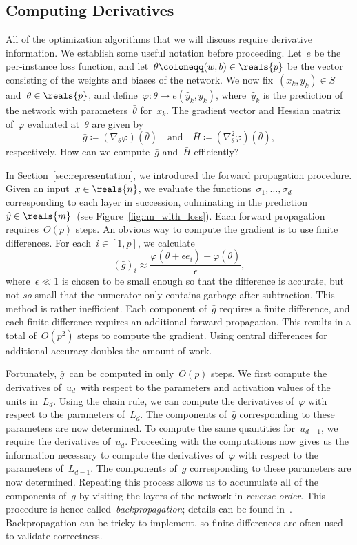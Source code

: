 \documentclass[11pt,a4paper]{article}
\numberwithin{equation}{section}
\begin{document}
\subsection{Computing Derivatives}
\label{sec:computing_derivatives}

All of the optimization algorithms that we will discuss require derivative
information. We establish some useful notation before proceeding. Let~$e$ be the
per-instance loss function, and let~$\theta \coloneqq (w, b) \in \reals{p}$ be
the vector consisting of the weights and biases of the network. We now
fix~$(x_k, y_k) \in S$ and~$\bar{\theta} \in \reals{p}$, and define~$\varphi :
\theta \mapsto e(\hat{y}_k, y_k)$, where~$\hat{y}_k$ is the prediction of the
network with parameters~$\bar{\theta}$ for~$x_k$. The gradient vector and
Hessian matrix of~$\varphi$ evaluated at~$\bar{\theta}$ are given by
\[
	\bar{g} \coloneqq (\nabla_\theta \varphi)(\bar{\theta})
	\quad\text{and}\quad
	\bar{H} \coloneqq (\nabla^2_\theta \varphi)(\bar{\theta}),
\]
respectively. How can we compute~$\bar{g}$ and~$\bar{H}$ efficiently?

In Section~\ref{sec:representation}, we introduced the forward propagation
procedure. Given an input~$x \in \reals{n}$, we evaluate the
functions~$\sigma_1, \ldots, \sigma_d$ corresponding to each layer in
succession, culminating in the prediction~$\hat{y} \in \reals{m}$~(see
Figure~\ref{fig:nn_with_loss}). Each forward propagation requires~$O(p)$ steps.
An obvious way to compute the gradient is to use finite differences. For each~$i
\in [1, p]$, we calculate
\[
	(\bar{g})_i \approx \frac{\varphi(\bar{\theta} + \epsilon e_i) -
		\varphi(\bar{\theta})}{\epsilon},
\]
where~$\epsilon \ll 1$ is chosen to be small enough so that the difference is
accurate, but not \emph{so} small that the numerator only contains garbage after
subtraction. This method is rather inefficient. Each component of~$\bar{g}$
requires a finite difference, and each finite difference requires an additional
forward propagation. This results in a total of~$O(p^2)$ steps to compute the
gradient. Using central differences for additional accuracy doubles the amount
of work.

Fortunately, $\bar{g}$~can be computed in only~$O(p)$ steps. We first compute
the derivatives of~$u_d$~with respect to the parameters and activation values of
the units in~$L_d$. Using the chain rule, we can compute the derivatives
of~$\varphi$ with respect to the parameters of~$L_d$. The components
of~$\bar{g}$ corresponding to these parameters are now determined. To compute
the same quantities for~$u_{d - 1}$, we require the derivatives of~$u_{d}$.
Proceeding with the computations now gives us the information necessary to
compute the derivatives of~$\varphi$ with respect to the parameters of~$L_{d -
1}$. The components of~$\bar{g}$ corresponding to these parameters are now
determined. Repeating this process allows us to accumulate all of the components
of~$\bar{g}$ by visiting the layers of the network in \emph{reverse order}.
This procedure is hence called~\emph{backpropagation}; details can be found
in~\citet{ml_bishop}. Backpropagation can be tricky to implement, so finite
differences are often used to validate correctness.
\end{document}
